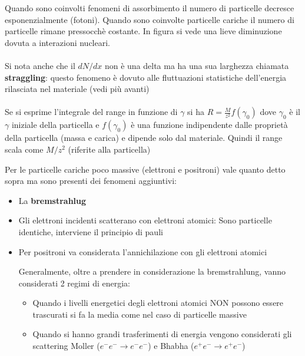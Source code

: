 \begin{minipage}{0.48\textwidth}
    Quando sono coinvolti fenomeni di assorbimento il numero di particelle decresce esponenzialmente (fotoni).
Quando sono coinvolte particelle cariche il numero di particelle rimane pressocchè costante. In figura si vede una lieve diminuzione dovuta a interazioni nucleari.
\\
\\
Si nota anche che il $dN/dx$ non è una delta ma ha una sua larghezza chiamata \textbf{straggling}: questo fenomeno è dovuto alle fluttuazioni statistiche dell'energia rilasciata nel materiale (vedi più avanti)
\\
\\
    Se si esprime l'integrale del range in funzione di $\gamma$ si ha $R=\frac{M}{z^2}f(\gamma_0)$ dove $\gamma_0$ è il $\gamma$ iniziale della particella e $f(\gamma_0)$ è una funzione indipendente dalle proprietà della particella (massa e carica) e dipende solo dal materiale. Quindi il range scala come $M/z^2$ (riferite alla particella)

\end{minipage}
Per le particelle cariche poco massive (elettroni e positroni) vale quanto detto sopra ma sono presenti dei fenomeni aggiuntivi:
\begin{itemize}


    \item La \textbf{bremstrahlug}
    \item Gli elettroni incidenti scatterano con elettroni atomici: Sono particelle identiche, interviene il principio di pauli
    \item Per positroni va considerata l'annichilazione con gli elettroni atomici

    Generalmente, oltre a prendere in considerazione la bremstrahlung, vanno considerati 2 regimi di energia:
    \begin{itemize}
        \item Quando i livelli energetici degli elettroni atomici NON possono essere trascurati si fa la media come nel caso di particelle massive
        \item Quando si hanno grandi trasferimenti di energia vengono considerati gli scattering Moller ($e^- e^- \to e^- e^-$) e Bhabha ($e^+ e^- \to e^+ e^-$)
    \end{itemize}


\end{itemize}

